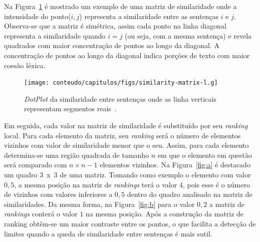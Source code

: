
Na Figura~\ref{fig:matrix-similarity} é mostrado um exemplo de uma matriz de similaridade onde a intensidade do ponto($i,j$) representa a similaridade entre as sentenças $i$ e $j$. Observa-se que a matriz é simétrica, assim cada ponto na linha diagonal representa a similaridade quando $i = j$ (ou seja, com a mesma sentença) e revela quadrados com maior concentração de pontos ao longo da diagonal. A concentração de pontos ao longo da diagonal indica porções de texto com maior coesão léxica.


  \begin{figure}[!h]
	  \centering
	  \texttt{[image: conteudo/capitulos/figs/similarity-matrix-l.g]}

	  \caption{\textit{DotPlot} da similaridade entre sentenças onde as linha verticais representam segmentos reais~\cite{Eisenstein2008}.}
	  \label{fig:matrix-similarity}
  \end{figure}




Em seguida, cada valor na matriz de similaridade é substituído por seu \textit{ranking} local. Para cada elemento da matriz, seu \textit{ranking} será o número de elementos vizinhos com valor de similaridade menor que o seu. Assim, para cada elemento determina-se uma região quadrada de tamanho $n$ em que o elemento em questão será comparado com $n \times n - 1$ elementos vizinhos.
% 
% 
Na Figura~\ref{fig:a} é destacado um quadro 3~x~3 de uma matriz. Tomando como exemplo o elemento com valor $0,5$, a mesma posição na matriz de \textit{rankings} terá o valor $4$, pois esse é o número de vizinhos com valores inferiores a $0,5$ dentro do quadro analisado na matriz de similaridades. Da mesma forma, na Figura~\ref{fig:b} para o valor $0,2$ a matriz de \textit{rankings} conterá o valor $1$ na mesma posição. Após a construção da matriz de ranking obtêm-se um maior contraste entre os pontos, o que facilita a detecção de limites quando a queda de similaridade entre sentenças é mais sutil.

